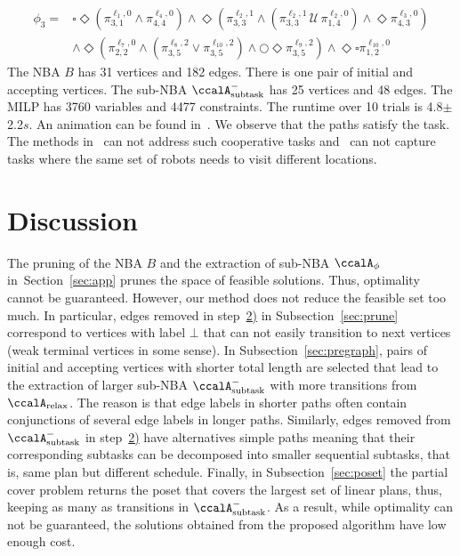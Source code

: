 \documentclass[Afour,sageh,times]{sagej}
\newcommand{\auto}[1]{\ccalA_{\textup{#1}}}
\newcommand{\autop}{\ccalA_{\phi}}
\newcommand{\aap}[4]{\mathcal{\pi}_{{#1},{#2}}^{#3,#4}}
\begin{document}
{\small
\begingroup
\begin{align*}
  \phi_3 = &  \square \Diamond (\pi^{\ell_1,0}_{3,1} \wedge \pi^{\ell_4, 0}_{4,4}) \wedge \Diamond ( \pi^{\ell_2,1}_{3,3} \wedge  (\pi^{\ell_2,1}_{3,3} \,\mathcal{U} \, \pi^{\ell_2,0}_{1,4})  \wedge \Diamond \pi_{4,3}^{\ell_3,0})   \nonumber \\ & \wedge \Diamond (\aap{2}{2}{\ell_7}{0} \wedge (\aap{3}{5}{\ell_8}{2} \vee \aap{3}{5}{\ell_{10}}{2}) \wedge \bigcirc  \Diamond  \aap{3}{5}{\ell_{9}}{2} ) \wedge \Diamond \square \aap{1}{2}{\ell_{10}}{0}
\end{align*}
\endgroup
\normalsize
The NBA $B$ has 31 vertices and 182 edges. There is one pair of initial and accepting vertices. The sub-NBA $\auto{subtask}^-$ has 25 vertices and 48 edges. The MILP has 3760 variables and 4477 constraints. The runtime over 10 trials is 4.8$\pm$2.2$s$. {An animation can be found in~\cite{ltlmrta}.} We observe that the paths satisfy the task. The methods in~\cite{schillinger2018decomposition,schillinger2018simultaneous,faruq2018simultaneous} can not address such cooperative tasks and~\cite{sahin2017provably,sahin2017synchronous,sahin2019multi,sahin2019multirobot} can not capture tasks where the same set of robots needs to visit different locations.


\section{Discussion}
The pruning of the NBA $B$ and the extraction of sub-NBA $\autop$ in~Section~\ref{sec:app} prunes the space of feasible solutions. Thus, optimality cannot be guaranteed. However, our method does not reduce the feasible set  too much. In particular, edges removed in step~\hyperref[prune:2]{2)} in Subsection~\ref{sec:prune} correspond to vertices with label $\bot$ that can not easily transition to next vertices {(weak terminal vertices in some sense)}. {In Subsection~\ref{sec:pregraph}, pairs of initial and accepting vertices with shorter total length are selected that lead to the  extraction of larger sub-NBA $\auto{subtask}^-$ {with more transitions} from $\auto{relax}$.} {The reason is that edge labels in shorter paths often contain conjunctions of several edge labels in longer paths}. Similarly, edges removed from $\auto{subtask}^-$ in step~\hyperref[sec:pregraph]{2)} {have alternatives simple paths} meaning that their corresponding subtasks can be decomposed into smaller sequential subtasks, {that is, same plan but different schedule}. Finally, in Subsection~\ref{sec:poset} the partial cover problem returns the poset that covers the largest set of linear plans, thus, keeping as many as transitions in $\auto{subtask}^-$. As a result, while optimality can not be guaranteed,  the solutions obtained from the proposed algorithm have low  enough cost. %
}
\end{document}
